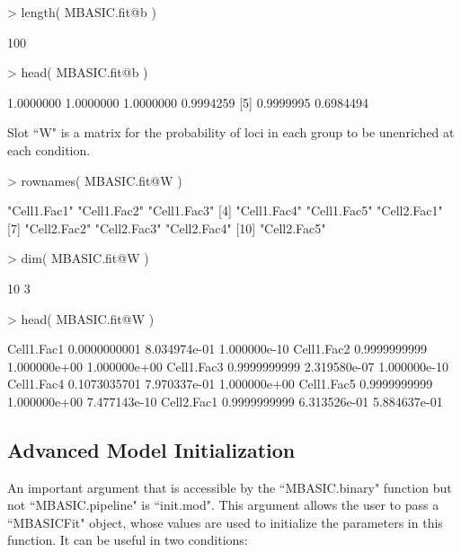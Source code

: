 \documentclass[a4paper,10pt]{article}
\begin{document}
\begin{Schunk}
\begin{Sinput}
> length( MBASIC.fit@b )
\end{Sinput}
\begin{Soutput}
[1] 100
\end{Soutput}
\begin{Sinput}
> head( MBASIC.fit@b )
\end{Sinput}
\begin{Soutput}
[1] 1.0000000 1.0000000 1.0000000 0.9994259
[5] 0.9999995 0.6984494
\end{Soutput}
\end{Schunk}

Slot ``W" is a matrix for the probability of loci in each group to be unenriched at each condition.

\begin{Schunk}
\begin{Sinput}
> rownames( MBASIC.fit@W )
\end{Sinput}
\begin{Soutput}
 [1] "Cell1.Fac1" "Cell1.Fac2" "Cell1.Fac3"
 [4] "Cell1.Fac4" "Cell1.Fac5" "Cell2.Fac1"
 [7] "Cell2.Fac2" "Cell2.Fac3" "Cell2.Fac4"
[10] "Cell2.Fac5"
\end{Soutput}
\begin{Sinput}
> dim( MBASIC.fit@W )
\end{Sinput}
\begin{Soutput}
[1] 10  3
\end{Soutput}
\begin{Sinput}
> head( MBASIC.fit@W )
\end{Sinput}
\begin{Soutput}
                   [,1]         [,2]         [,3]
Cell1.Fac1 0.0000000001 8.034974e-01 1.000000e-10
Cell1.Fac2 0.9999999999 1.000000e+00 1.000000e+00
Cell1.Fac3 0.9999999999 2.319580e-07 1.000000e-10
Cell1.Fac4 0.1073035701 7.970337e-01 1.000000e+00
Cell1.Fac5 0.9999999999 1.000000e+00 7.477143e-10
Cell2.Fac1 0.9999999999 6.313526e-01 5.884637e-01
\end{Soutput}
\end{Schunk}

\subsection{Advanced Model Initialization}

An important argument that is accessible by the ``MBASIC.binary" function but not ``MBASIC.pipeline" is ``init.mod". This argument allows the user to pass a ``MBASICFit" object, whose values are used to initialize the parameters in this function. It can be useful in two conditions:
\end{document}
